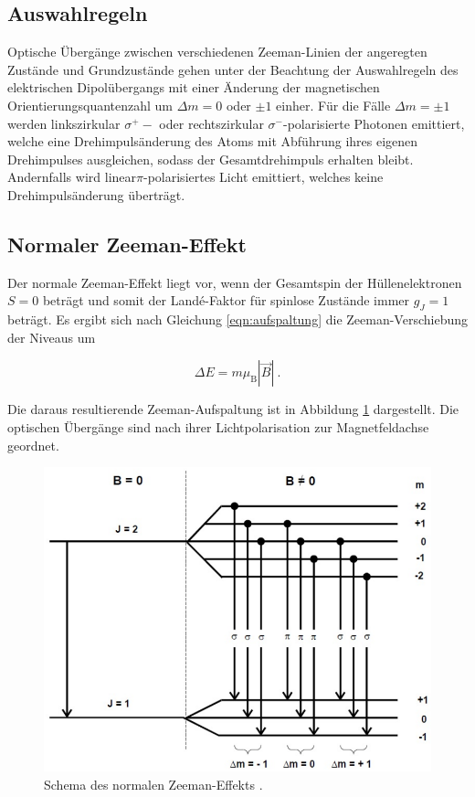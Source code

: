 \subsection{Auswahlregeln}

Optische Übergänge zwischen verschiedenen Zeeman-Linien der angeregten
Zustände und Grundzustände gehen unter der Beachtung der Auswahlregeln des elektrischen Dipolübergangs
 mit einer Änderung der magnetischen Orientierungsquantenzahl um $\Delta m = 0$ oder $\pm 1$ einher.
Für die Fälle $\Delta m = \pm 1$ werden linkszirkular $\sigma^{+}-$ oder rechtszirkular $\sigma^{-}$-polarisierte
Photonen emittiert, welche eine Drehimpulsänderung des Atoms mit Abführung ihres eigenen Drehimpulses ausgleichen,
sodass der Gesamtdrehimpuls erhalten bleibt. Andernfalls wird linear$\pi$-polarisiertes Licht emittiert,
welches keine Drehimpulsänderung überträgt.

\subsection{Normaler Zeeman-Effekt}

Der normale Zeeman-Effekt liegt vor, wenn der Gesamtspin der Hüllenelektronen $S = 0$ beträgt und somit 
der Landé-Faktor für spinlose Zustände immer $g_J = 1$ beträgt.
Es ergibt sich nach Gleichung \eqref{eqn:aufspaltung} die Zeeman-Verschiebung der Niveaus um

\begin{equation}
    \Delta E = m \mu_\text{B} |\vec{B}|\: .
\end{equation}

Die daraus resultierende Zeeman-Aufspaltung ist in Abbildung \ref{fig:norm}
dargestellt. Die optischen Übergänge sind nach ihrer Lichtpolarisation zur Magnetfeldachse 
geordnet. 

\vspace{-5pt}
\begin{figure}[H]
    \centering
    \includegraphics[scale=0.3]{content/normalerzeeman.png}
    \caption{Schema des normalen Zeeman-Effekts \cite{alt}.}
    \label{fig:norm}
\end{figure}


